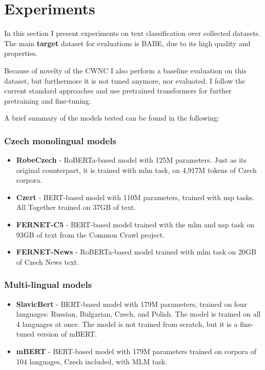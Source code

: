 \chapter{Experiments}\label{experiments}
In this section I present experiments on text classification over collected datasets. The main \textbf{target} dataset for evaluations is BABE, due to its high quality and properties.

Because of novelty of the CWNC I also perform a baseline evaluation on this dataset, but furthermore it is not tuned anymore, nor evaluated.
I follow the current standard approaches and use pretrained transformers for further pretraining and fine-tuning. 

A brief summary of the models tested can be found in the following:




\subsection{Czech monolingual models}
\begin{itemize}
    \item \textbf{RobeCzech} \cite{strakarobeczech} - RoBERTa-based model with 125M parameters. Just as its original counterpart, it is trained with \gls{mlm} task, on 4,917M tokens of Czech corpora.
    \item \textbf{Czert} \cite{sido-etal-2021-czert} - BERT-based model with 110M parameters, trained with \gls{nsp} tasks. All Together trained on 37GB of text. 
    \item \textbf{FERNET-C5} \cite{lehevcka2021comparison} - BERT-based model trained with the \gls{mlm} and \gls{nsp} task on 93GB of text from the Common Crawl project.
    \item \textbf{FERNET-News} \cite{lehevcka2021comparison} - RoBERTa-based model trained with \gls{mlm} task on 20GB of Czech News text.
\end{itemize}






\subsection{Multi-lingual models}
\begin{itemize}
    \item \textbf{SlavicBert} \cite{arkhipov2019tuning} - BERT-based model with 179M parameters, trained on four languages: Russian, Bulgarian, Czech, and Polish. The model is trained on all 4 languages at once. The model is not trained from scratch, but it is a fine-tuned version of mBERT.
    \item \textbf{mBERT} - BERT-based model with 179M parameters trained on corpora of 104 languages, Czech included, with MLM task.
\end{itemize}




